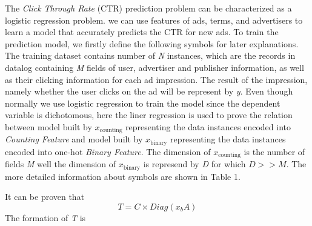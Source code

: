 The \textsl{Click Through Rate} (CTR) prediction problem can be characterized as a logistic regression problem. we can use features of ads, terms, and advertisers to learn a model that accurately predicts the CTR for new ads. To train the prediction model, we firstly define the following symbols for later explanations.\vspace{5mm}
The training dataset contains number of \textsl{N} instances, which are the records in datalog containing \textsl{M} fields of user, advertiser and publisher information, as well as their clicking information for each ad impression. The result of the impression, namely whether the user clicks on the ad will be represent by \textsl{y}. Even though normally we use logistic regression to train the model since the dependent variable is dichotomous, here the liner regression is used to prove the relation between model built by \(x_{\text{counting}}\) representing the data instances encoded into \textsl{Counting Feature} and model built by \(x_{\text{binary}}\) representing the data instances encoded into one-hot \textsl{Binary Feature}. The dimension of \(x_{\text{counting}}\) is the number of fields \textsl{M} well the dimension of \(x_{\text{binary}}\) is represend by \textsl{D} for which \(D >> M\). The more detailed information about symbols are shown in Table 1.

 It can be proven that 
\[ T = C\times Diag(x_{b}A) \]
The formation of \textsl{T} is 

